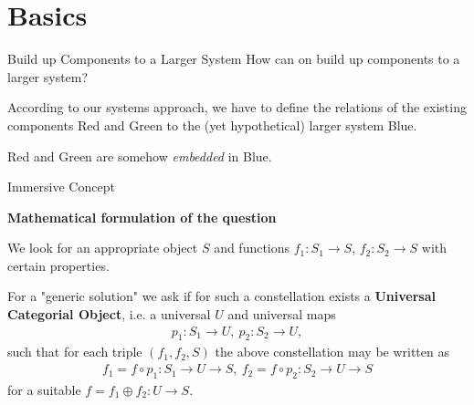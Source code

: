 \documentclass{beamer}
\title{Modelling Sustainable Systems\\ and Semantic Web\\[6pt]
  Immersive and Submersive System Theories
  \vskip1em}
\subtitle{Lecture in the Module 10-202-2309\\ for Master Computer Science}
\author{Prof. Dr. Hans-Gert Gräbe\\
\url{http://www.informatik.uni-leipzig.de/~graebe}}
\date{October 2021}
\newcommand{\ueberschrift}[1]{\begin{center}\bf #1\end{center}}
\begin{document}
{
\begin{frame}
  \titlepage
\end{frame}}

\section{Basics}
\begin{frame}{Build up Components to a Larger System}
How can on build up components to a larger system? 

According to our systems approach, we have to define the relations of the
existing components Red and Green to the (yet hypothetical) larger system
Blue. 
\begin{center}  
\end{center}
Red and Green are somehow \emph{embedded} in Blue.

\end{frame}
\begin{frame}{Immersive Concept}

\ueberschrift{Mathematical formulation of the question}
\small

We look for an appropriate object $S$ and functions $f_1: S_1 \rightarrow S$,
$f_2: S_2 \rightarrow S$ with certain properties.

For a "generic solution" we ask if for such a constellation exists a
\textbf{Universal Categorial Object}, i.e. a universal $U$ and universal maps
\begin{gather*}
  p_1: S_1 \rightarrow U,\ p_2: S_2 \rightarrow U,
\end{gather*}
such that for each triple $(f_1, f_2, S)$ the above constellation may be
written as
\begin{gather*}
  f_1 = f \circ p_1: S_1 \rightarrow U \rightarrow S,\ f_2 = f \circ p_2 : S_2
  \rightarrow U \rightarrow S
\end{gather*}
for a suitable $f = f_1 \oplus f_2: U \rightarrow S$.

\end{frame}
\end{document}

